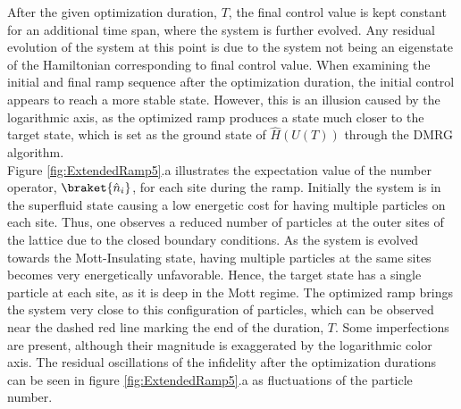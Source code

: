 After the given optimization duration, $T$, the final control value is kept constant for an additional time span, where the system is further evolved. Any residual evolution of the system at this point is due to the system not being an eigenstate of the Hamiltonian corresponding to final control value. When examining the initial and final ramp sequence after the optimization duration, the initial control appears to reach a more stable state. However, this is an illusion caused by the logarithmic axis, as the optimized ramp produces a state much closer to the target state, which is set as the ground state of $\hat{H}(U(T))$ through the DMRG algorithm.\\ 
Figure \ref{fig:ExtendedRamp5}.a illustrates the expectation value of the number operator, $\braket{\hat{n}_i}$, for each site during the ramp. Initially the system is in the superfluid state causing a low energetic cost for having multiple particles on each site. Thus, one observes a reduced number of particles at the outer sites of the lattice due to the closed boundary conditions. As the system is evolved towards the Mott-Insulating state, having multiple particles at the same sites becomes very energetically unfavorable. Hence, the target state has a single particle at each site, as it is deep in the Mott regime. The optimized ramp brings the system very close to this configuration of particles, which can be observed near the dashed red line marking the end of the duration, $T$. Some imperfections are present, although their magnitude is exaggerated by the logarithmic color axis. The residual oscillations of the infidelity after the optimization durations can be seen in figure \ref{fig:ExtendedRamp5}.a as fluctuations of the particle number. 


